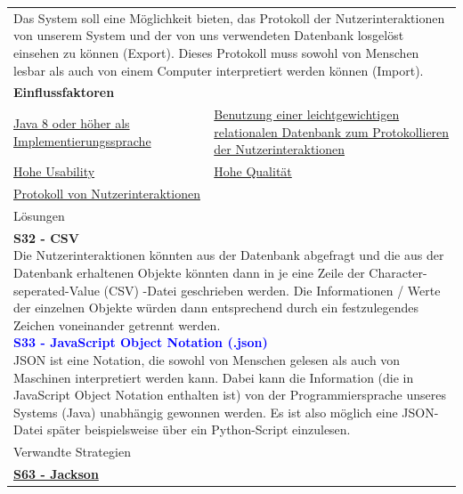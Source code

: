 \documentclass[enabledeprecatedfontcommands,fontsize=11pt,paper=a4,twoside]{scrartcl}
\newcounter{one}
\newcommand{\cb}[1]{{\textcolor{blue}{#1}}}
\begin{document}
\begin{tabular} {|p{8cm} p{8cm}|}
	\hline
	\rowcolor{prob}\multicolumn{2}{|l|}{\parbox{16cm}{\textbf{12: Protokoll der Nutzerinteraktionen exportieren/ importieren}}} \\  \hline\hline 
	\multicolumn{2}{|l|}{\parbox{16cm}{Das System soll eine Möglichkeit bieten, das Protokoll der Nutzerinteraktionen von unserem System und der von uns verwendeten Datenbank losgelöst einsehen zu können (Export). Dieses Protokoll muss sowohl von Menschen lesbar als auch von einem Computer interpretiert werden können (Import).}}\rule{0pt}{7ex}\\ [4ex] \hline
	\multicolumn{2}{|l|}{\textbf{Einflussfaktoren}}\\
	\hyperlink{b}{Java 8 oder höher als Implementierungssprache} &
	\hyperlink {d}{Benutzung einer leichtgewichtigen relationalen Datenbank zum Protokollieren der Nutzerinteraktionen}\\ 
	\hyperlink {g}{Hohe Usability}&
	\hyperlink {h}{Hohe Qualität}\\
	\hyperlink {bb}{Protokoll von Nutzerinteraktionen} &
	\\ \hline
	\multicolumn{2}{|l|}{Lösungen} \\
	\multicolumn{2}{|l|}{\parbox{16cm}{
			\textbf{S32 - CSV} \\
			Die Nutzerinteraktionen könnten aus der Datenbank abgefragt und die aus der Datenbank erhaltenen Objekte könnten dann in je eine Zeile der Character-seperated-Value (CSV) -Datei geschrieben werden. Die Informationen / Werte der einzelnen Objekte würden dann entsprechend durch ein festzulegendes Zeichen voneinander getrennt werden. \\
			\textbf{\cb{\hypertarget{jjj}{S33 - JavaScript Object Notation (.json)}}} \\
			JSON ist eine Notation, die sowohl von Menschen gelesen als auch von Maschinen interpretiert werden kann. Dabei kann die Information (die in JavaScript Object Notation enthalten ist) von der Programmiersprache unseres Systems (Java) unabhängig gewonnen werden. Es ist also möglich eine JSON-Datei später beispielsweise über ein Python-Script einzulesen.
	} }\\ \hline
	\multicolumn{2}{|l|}{Verwandte Strategien} \\
	\textbf{\hyperlink{www}{S63 - Jackson}}&
	\\\hline
\end{tabular}\\ \\ \\
\end{document}
